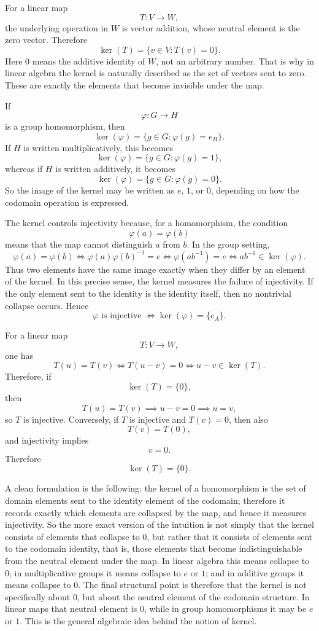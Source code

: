 \documentclass[12pt]{article}
\begin{document}
	For a linear map
	\[
	T:V\to W,
	\]
	the underlying operation in \(W\) is vector addition, whose neutral element is the zero vector. Therefore
	\[
	\ker(T)=\{v\in V:T(v)=0\}.
	\]
	Here \(0\) means the additive identity of \(W\), not an arbitrary number. That is why in linear algebra the kernel is naturally described as the set of vectors sent to zero. These are exactly the elements that become invisible under the map.
	
	If
	\[
	\varphi:G\to H
	\]
	is a group homomorphism, then
	\[
	\ker(\varphi)=\{g\in G:\varphi(g)=e_H\}.
	\]
	If \(H\) is written multiplicatively, this becomes
	\[
	\ker(\varphi)=\{g\in G:\varphi(g)=1\},
	\]
	whereas if \(H\) is written additively, it becomes
	\[
	\ker(\varphi)=\{g\in G:\varphi(g)=0\}.
	\]
	So the image of the kernel may be written as \(e\), \(1\), or \(0\), depending on how the codomain operation is expressed.
	
	The kernel controls injectivity because, for a homomorphism, the condition
	\[
	\varphi(a)=\varphi(b)
	\]
	means that the map cannot distinguish \(a\) from \(b\). In the group setting,
	\[
	\varphi(a)=\varphi(b)
	\iff \varphi(a)\varphi(b)^{-1}=e
	\iff \varphi(ab^{-1})=e
	\iff ab^{-1}\in\ker(\varphi).
	\]
	Thus two elements have the same image exactly when they differ by an element of the kernel. In this precise sense, the kernel measures the failure of injectivity. If the only element sent to the identity is the identity itself, then no nontrivial collapse occurs. Hence
	\[
	\varphi \text{ is injective } \iff \ker(\varphi)=\{e_A\}.
	\]
	
	For a linear map
	\[
	T:V\to W,
	\]
	one has
	\[
	T(u)=T(v)
	\iff T(u-v)=0
	\iff u-v\in\ker(T).
	\]
	Therefore, if
	\[
	\ker(T)=\{0\},
	\]
	then
	\[
	T(u)=T(v)\implies u-v=0\implies u=v,
	\]
	so \(T\) is injective. Conversely, if \(T\) is injective and \(T(v)=0\), then also
	\[
	T(v)=T(0),
	\]
	and injectivity implies
	\[
	v=0.
	\]
	Therefore
	\[
	\ker(T)=\{0\}.
	\]
	
	A clean formulation is the following: the kernel of a homomorphism is the set of domain elements sent to the identity element of the codomain; therefore it records exactly which elements are collapsed by the map, and hence it measures injectivity. So the more exact version of the intuition is not simply that the kernel consists of elements that collapse to \(0\), but rather that it consists of elements sent to the codomain identity, that is, those elements that become indistinguishable from the neutral element under the map. In linear algebra this means collapse to \(0\); in multiplicative groups it means collapse to \(e\) or \(1\); and in additive groups it means collapse to \(0\). The final structural point is therefore that the kernel is not specifically about \(0\), but about the neutral element of the codomain structure. In linear maps that neutral element is \(0\), while in group homomorphisms it may be \(e\) or \(1\). This is the general algebraic idea behind the notion of kernel.
	
\end{document}
